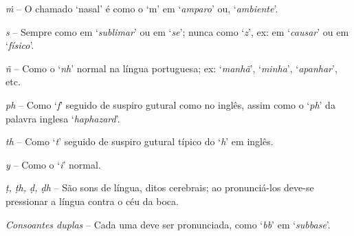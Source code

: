 \emph{ṁ} -- O chamado `nasal' é como o `m' em `\emph{amparo}' ou, `\emph{ambiente}'.

\emph{s} -- Sempre como em `\emph{sublimar}' ou em `\emph{se}'; nunca como `\emph{z}', ex: em `\emph{causar}' ou em `\emph{físico}'.

\emph{ñ} -- Como o `\emph{nh}' normal na língua portuguesa; ex: `\emph{manhã}', `\emph{minha}', `\emph{apanhar}', etc.

\emph{ph} -- Como `\emph{f}' seguido de suspiro gutural como no inglês, assim como o `\emph{ph}' da palavra inglesa `\emph{haphazard}'.

\emph{th} -- Como `\emph{t}' seguido de suspiro gutural típico do `\emph{h}' em inglês.

\emph{y} -- Como o `\emph{i}' normal.

\emph{ṭ, ṭh, ḍ, ḍh} -- São sons de língua, ditos cerebrais; ao pronunciá-los deve-se pressionar a língua contra o céu da boca.

\emph{Consoantes duplas} -- Cada uma deve ser pronunciada, como `\emph{bb}' em `\emph{subbase}'.
